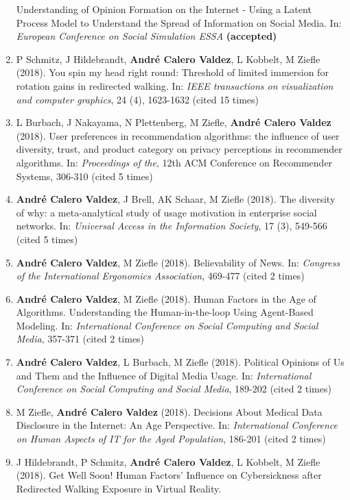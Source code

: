 \documentclass[11pt,a4paper,sans]{moderncv}
\begin{document}
\begin{enumerate}
  Understanding of Opinion Formation on the Internet - Using a Latent
  Process Model to Understand the Spread of Information on Social Media.
  In: \emph{European Conference on Social Simulation ESSA}
  \textbf{(accepted)}
\item
  P Schmitz, J Hildebrandt, \textbf{André Calero Valdez}, L Kobbelt, M
  Ziefle (2018). You spin my head right round: Threshold of limited
  immersion for rotation gains in redirected walking. In: \emph{IEEE
  transactions on visualization and computer graphics}, 24 (4),
  1623-1632 (cited 15 times)
\item
  L Burbach, J Nakayama, N Plettenberg, M Ziefle, \textbf{André Calero
  Valdez} (2018). User preferences in recommendation algorithms: the
  influence of user diversity, trust, and product category on privacy
  perceptions in recommender algorithms. In: \emph{Proceedings of the},
  12th ACM Conference on Recommender Systems, 306-310 (cited 5 times)
\item
  \textbf{André Calero Valdez}, J Brell, AK Schaar, M Ziefle (2018). The
  diversity of why: a meta-analytical study of usage motivation in
  enterprise social networks. In: \emph{Universal Access in the
  Information Society}, 17 (3), 549-566 (cited 5 times)
\item
  \textbf{André Calero Valdez}, M Ziefle (2018). Believability of News.
  In: \emph{Congress of the International Ergonomics Association},
  469-477 (cited 2 times)
\item
  \textbf{André Calero Valdez}, M Ziefle (2018). Human Factors in the
  Age of Algorithms. Understanding the Human-in-the-loop Using
  Agent-Based Modeling. In: \emph{International Conference on Social
  Computing and Social Media}, 357-371 (cited 2 times)
\item
  \textbf{André Calero Valdez}, L Burbach, M Ziefle (2018). Political
  Opinions of Us and Them and the Influence of Digital Media Usage. In:
  \emph{International Conference on Social Computing and Social Media},
  189-202 (cited 2 times)
\item
  M Ziefle, \textbf{André Calero Valdez} (2018). Decisions About Medical
  Data Disclosure in the Internet: An Age Perspective. In:
  \emph{International Conference on Human Aspects of IT for the Aged
  Population}, 186-201 (cited 2 times)
\item
  J Hildebrandt, P Schmitz, \textbf{André Calero Valdez}, L Kobbelt, M
  Ziefle (2018). Get Well Soon! Human Factors' Influence on
  Cybersickness after Redirected Walking Exposure in Virtual Reality.

\end{enumerate}
\end{document}

